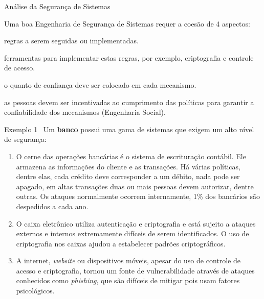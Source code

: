 \frame{\maketitle}


\begin{frame}{Análise da Segurança de Sistemas~\small\cite{ross2008}}

  Uma boa Engenharia de Segurança de Sistemas requer a coesão de
  4 aspectos:

  \begin{description}[<+-| alert@+>]
    \item[Políticas:] regras a serem seguidas ou implementadas.
    \item[Mecanismos:] ferramentas para implementar estas regras, por
      exemplo, criptografia e controle de acesso.
    \item[Confiabilidade:] o quanto de confiança deve ser colocado em cada mecanismo.
    \item[Incentivo:] as pessoas devem ser incentivadas ao cumprimento das políticas
      para garantir a confiabilidade dos mecanismos (Engenharia Social).
  \end{description}
\end{frame}

\begin{frame}{Exemplo 1~\small\cite{ross2008}}\small
  Um {\bf banco} possui uma gama de sistemas que exigem um alto nível de segurança:

  \begin{enumerate}[<+-| alert@+>]
  \item O cerne das operações bancárias é o sistema de escrituração
    contábil. Ele armazena as informações do cliente e as transações.
    Há várias políticas, dentre elas, cada crédito deve corresponder
    a um débito, nada pode ser apagado, em altas transações duas ou mais
    pessoas devem autorizar, dentre outras. Os ataques normalmente ocorrem
    internamente, 1\% dos bancários são despedidos a cada ano.
  \item O caixa eletrônico utiliza autenticação e criptografia e está
    sujeito a ataques externos e internos extremamente difíceis de
    serem identificados. O uso de criptografia nos caixas ajudou a
    estabelecer padrões criptográficos.
  \item A internet, {\em website} ou dispositivos móveis, apesar do
    uso de controle de acesso e criptografia, tornou um fonte de vulnerabilidade
    através de ataques conhecidos como {\em phishing}, que são difíceis
    de mitigar pois usam fatores psicológicos.
  \end{enumerate}
\end{frame}

